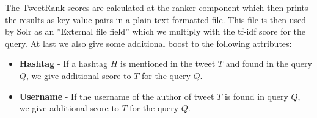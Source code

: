The TweetRank scores are calculated at the ranker component which then prints the results as key value pairs in a plain text formatted file. This file is then used by Solr as an ''External file field'' which we multiply with the tf-idf score for the query. At last we also give some additional boost to the following attributes:

\begin{itemize}
	\item \textbf{Hashtag} - If a hashtag $H$ is mentioned in the tweet $T$ and found in the query $Q$, we give additional score to $T$ for the query $Q$.
	\item \textbf{Username} - If the username of the author of tweet $T$ is found in query $Q$, we give additional score to $T$ for the query $Q$.
\end{itemize}
